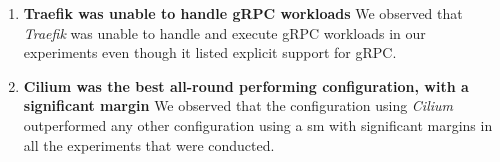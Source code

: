 \begin{enumerate}[label=\textbf{MF\arabic*}, leftmargin=3\parindent]
    \item \textbf{Traefik was unable to handle gRPC workloads}
    \label{exp:mf7}
    We observed that \textit{Traefik} was unable to handle and execute gRPC workloads in our experiments even though it listed explicit support for gRPC.
    
    \item \textbf{Cilium was the best all-round performing configuration, with a significant margin}
    \label{exp:mf8}
    We observed that the configuration using \textit{Cilium} outperformed any other configuration using a \gls{sm} with significant margins in all the experiments that were conducted.
\end{enumerate}






